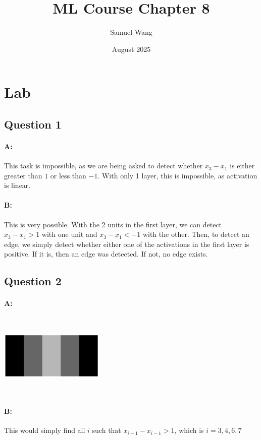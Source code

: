 \documentclass{article}
\title{ML Course Chapter 8}
\author{Samuel Wang}
\date{August 2025}
\begin{document}
\maketitle

\section{Lab}

\subsection{Question 1}

\paragraph{A: } This task is impossible, as we are being asked to detect whether $x_3-x_1$ is either greater than $1$ or less than $-1$. With only 1 layer, this is impossible, as activation is linear.

\paragraph{B: } This is very possible. With the 2 units in the first layer, we can detect $x_3-x_1>1$ with one unit and $x_3-x_1<-1$ with the other. Then, to detect an edge, we simply detect whether either one of the activations in the first layer is positive. If it is, then an edge was detected. If not, no edge exists.

\subsection{Question 2}

\paragraph{A: } \includegraphics[width=5cm, height=4cm]{Week 8 2A.png}

\paragraph{B: } This would simply find all $i$ such that $x_{i+1}-x_{i-1}>1$, which is $i=3, 4, 6, 7$
\end{document}
